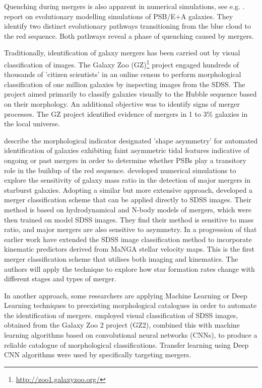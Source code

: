 Quenching during mergers is also apparent in numerical simulations, see e.g. \cite{2019MNRAS.484.2447D}. \citet{2019NatAs...3..440P} report on evolutionary modelling simulations of PSB/E+A galaxies. They identify two distinct evolutionary pathways transitioning from the blue cloud to the red sequence. Both pathways reveal a phase of quenching caused by mergers.

Traditionally, identification of galaxy mergers has been carried out by visual classification of images. The Galaxy Zoo (GZ)\footnote{\href{http://zoo1.galaxyzoo.org/}{http://zoo1.galaxyzoo.org/}} project \citet{10.1111/j.1365-2966.2008.13689.x,10.1111/j.1365-2966.2010.17432.x, 2017MNRAS.464.4176W} engaged hundreds of thousands of 'citizen scientists' in an online census to perform morphological classification of one million galaxies by inspecting images from the SDSS. The project aimed primarily to classify galaxies visually to the Hubble sequence based on their morphology. An additional objective was to identify signs of merger processes. The GZ project identified evidence of mergers in 1 to 3\% galaxies in the local universe.

\cite{2016MNRAS.456.3032P} describe the morphological indicator designated 'shape asymmetry' for automated identification of galaxies exhibiting faint asymmetric tidal features indicative of ongoing or past mergers in order to determine whether PSBs play a transitory role in the buildup of the red sequence. \cite{2011arXiv1102.0550B} developed numerical simulations to explore the sensitivity of galaxy mass ratio in the detection of major mergers in starburst galaxies. Adopting a similar but more extensive approach, \cite{2019ApJ...872...76N} developed a merger classification scheme that can be applied directly to SDSS images. Their method is based on hydrodynamical and N-body models of mergers, which were then trained on model SDSS images. They find their method is sensitive to mass ratio, and major mergers are also sensitive to asymmetry. In a progression of that earlier work  \cite{2019DDA....5020304N} have extended the SDSS image classification method to incorporate kinematic predictors derived from MaNGA stellar velocity maps. This is the first merger classification scheme that utilises both imaging and kinematics. The authors will apply the technique to explore how star formation rates change with different stages and types of merger. 

In another approach, some researchers are applying Machine Learning or Deep Learning techniques to preexisting morphological catalogues in order to automate the identification of mergers. \citet{2018MNRAS.476.3661D} employed visual classification of SDSS images, obtained from the Galaxy Zoo 2 project (GZ2), combined this with machine learning algorithms based on convolutional neural networks (CNNs), to produce a reliable catalogue of  morphological classifications. Transfer learning using Deep CNN algorithms were used by \citet{2018MNRAS.479..415A} specifically targeting mergers. 

